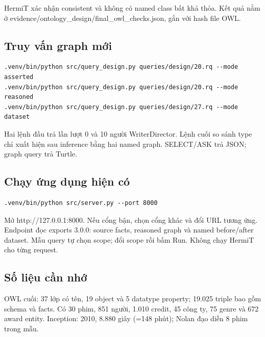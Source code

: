 \documentclass[
  11pt,
]{article}
\begin{document}
HermiT xác nhận consistent và không có named class bất khả thỏa. Kết quả
nằm ở
evidence\allowbreak{}/\allowbreak{}ontolog\allowbreak{}y\_\allowbreak{}design\allowbreak{}/\allowbreak{}final\_\allowbreak{}o\allowbreak{}wl\_\allowbreak{}check\allowbreak{}s.\allowbreak{}json,
gắn với hash file OWL.

\subsection{Truy vấn graph mới}\label{truy-vux1ea5n-graph-mux1edbi}

\begin{verbatim}
.venv/bin/python src/query_design.py queries/design/20.rq --mode asserted
.venv/bin/python src/query_design.py queries/design/20.rq --mode reasoned
.venv/bin/python src/query_design.py queries/design/27.rq --mode dataset
\end{verbatim}

Hai lệnh đầu trả lần lượt 0 và 10 người
Writer\allowbreak{}Di\allowbreak{}rector.\allowbreak{} Lệnh cuối so sánh
type chỉ xuất hiện sau inference bằng hai named graph. SELECT/ASK trả
JSON; graph query trả Turtle.

\subsection{Chạy ứng dụng hiện
có}\label{chux1ea1y-ux1ee9ng-dux1ee5ng-hiux1ec7n-cuxf3}

\begin{verbatim}
.venv/bin/python src/server.py --port 8000
\end{verbatim}

Mở
http:\allowbreak{}/\allowbreak{}/\allowbreak{}1\allowbreak{}27.\allowbreak{}0.\allowbreak{}0.\allowbreak{}1\allowbreak{}:\allowbreak{}8000.\allowbreak{}
Nếu cổng bận, chọn cổng khác và đổi URL tương ứng. Endpoint đọc exports
3.0.0: source facts, reasoned graph và named before/after dataset. Mẫu
query tự chọn scope; đổi scope rồi bấm Run. Không chạy HermiT cho từng
request.

\subsection{Số liệu cần nhớ}\label{sux1ed1-liux1ec7u-cux1ea7n-nhux1edb}

OWL cuối: 37 lớp có tên, 19 object và 5 datatype property; 19.025 triple
bao gồm schema và facts. Có 30 phim, 851 người, 1.010 credit, 45 công
ty, 75 genre và 672 award entity. Inception: 2010, 8.880 giây (=148
phút); Nolan đạo diễn 8 phim trong mẫu.
\end{document}
